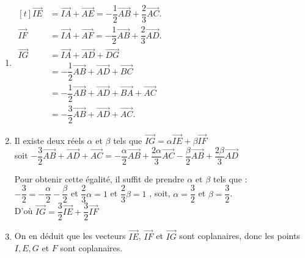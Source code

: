\documentclass{cornouaille}
\begin{document}
\begin{methode*1}
\correction

\begin{enumerate}
\item
  $ \begin{aligned}[t]
 \overrightarrow{IE} &= \overrightarrow{IA}+\overrightarrow{AE}=-\dfrac{1}{2}\overrightarrow{AB}+\dfrac{2}{3}\overrightarrow{AC}.\\
%
  \overrightarrow{IF}
  &=\overrightarrow{IA}+\overrightarrow{AF}=-\dfrac{1}{2}\overrightarrow{AB}+\dfrac{2}{3}\overrightarrow{AD}.\\
%
   \overrightarrow {IG}&=\overrightarrow{IA}+\overrightarrow{AD}+\overrightarrow{DG}\\
    &=-\dfrac{1}{2}\overrightarrow{AB}+\overrightarrow{AD}+\overrightarrow{BC}\\
    &=-\dfrac{1}{2}\overrightarrow{AB}+\overrightarrow{AD}+\overrightarrow{BA}+\overrightarrow{AC}\\
    &=-\dfrac{3}{2}\overrightarrow{AB}+\overrightarrow{AD}+\overrightarrow{AC}.
  \end{aligned}
  $

\item Il existe deux réels $\alpha$ et $\beta$ tels que
  $\overrightarrow{IG}=\alpha\overrightarrow{IE}+\beta\overrightarrow{IF}$
  \\[1mm]
  soit
  $
  -\dfrac{3}{2}\overrightarrow{AB}+\overrightarrow{AD}+\overrightarrow{AC}=-\dfrac{\alpha}{2}\overrightarrow{AB}+\dfrac{2\alpha}{3}\overrightarrow{AC}-\dfrac{\beta}{2}\overrightarrow{AB}+\dfrac{2\beta}{3}\overrightarrow{AD}$

\vspace{1mm}

Pour obtenir cette égalité, il suffit de prendre $\alpha$ et $\beta$
tels que : \\[1mm]
$-\dfrac{3}{2}=-\dfrac{\alpha}{2}-\dfrac{\beta}{2}$ et $\dfrac{2}{3} \alpha=1$ et $\dfrac{2}{3} \beta=1$ , soit, $ \alpha=\dfrac{3}{2}$ et $\beta=\dfrac{3}{2}$.\\[1mm]
D'où
$\overrightarrow{IG}=\dfrac{3}{2}\overrightarrow{IE}+\dfrac{3}{2}\overrightarrow{IF}$

\item On en déduit que les vecteurs $\overrightarrow{IE}$, $
  \overrightarrow{IF}$ et $\overrightarrow{IG}$ sont coplanaires, donc
  les points $I, E, G$ et $F$ sont coplanaires.
\end{enumerate}

\vspace{-2\baselineskip}
\end{methode*1}
\end{document}
